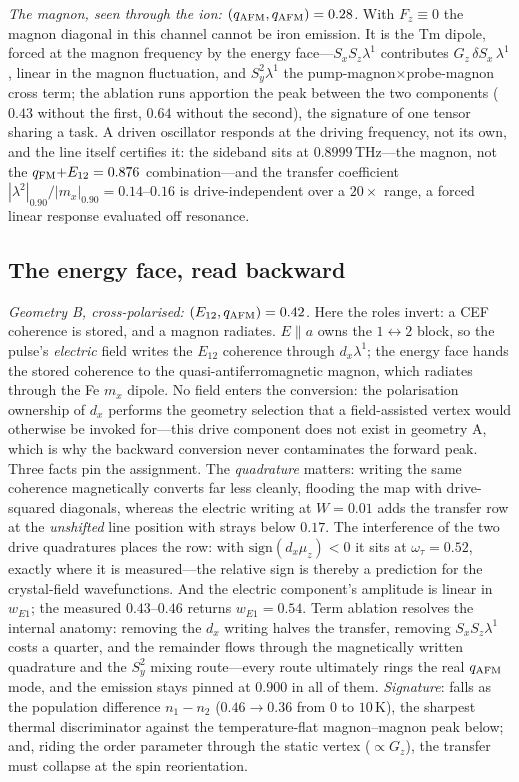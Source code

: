 \documentclass[aps,prb,twocolumn,superscriptaddress,longbibliography]{revtex4-2}
\newcommand{\qafm}{q_{\rm AFM}}
\newcommand{\qfm}{q_{\rm FM}}
\begin{document}
\emph{The magnon, seen through the ion: $(\qafm,\qafm)=0.28$.}  With
$F_z\equiv0$ the magnon diagonal in this channel cannot be iron
emission.  It is the Tm dipole, forced at the magnon frequency by the
energy face---$S_xS_z\lambda^1$ contributes $G_z\,\delta
S_x\,\lambda^1$, linear in the magnon fluctuation, and
$S_y^2\lambda^1$ the pump-magnon$\times$probe-magnon cross term; the
ablation runs apportion the peak between the two components ($0.43$
without the first, $0.64$ without the second), the signature of one
tensor sharing a task.  A driven oscillator responds at the driving
frequency, not its own, and the line itself certifies it: the
sideband sits at $0.8999$\,THz---the magnon, not the
$\qfm{+}E_{12}=0.876$ combination---and the transfer coefficient
$|\lambda^2|_{0.90}/|m_x|_{0.90}=0.14$--$0.16$ is drive-independent
over a $20\times$ range, a forced linear response evaluated off
resonance.

\subsection{The energy face, read backward}

\emph{Geometry B, cross-polarised: $(E_{12},\qafm)=0.42$.}  Here the
roles invert: a CEF coherence is stored, and a magnon radiates.
$E\!\parallel\!a$ owns the $1\!\leftrightarrow\!2$ block, so the
pulse's \emph{electric} field writes the $E_{12}$ coherence through
$d_x\lambda^1$; the energy face hands the stored coherence to the
quasi-antiferromagnetic magnon, which radiates through the Fe $m_x$
dipole.  No field enters the conversion: the polarisation ownership
of $d_x$ performs the geometry selection that a field-assisted vertex
would otherwise be invoked for---this drive component does not exist
in geometry A, which is why the backward conversion never
contaminates the forward peak.  Three facts pin the assignment.  The
\emph{quadrature} matters: writing the same coherence magnetically
converts far less cleanly, flooding the map with drive-squared
diagonals, whereas the electric writing at $W=0.01$ adds the transfer
row at the \emph{unshifted} line position with strays below $0.17$.
The interference of the two drive quadratures places the row: with
$\mathrm{sign}(d_x\mu_z)<0$ it sits at $\omega_\tau=0.52$, exactly
where it is measured---the relative sign is thereby a prediction for
the crystal-field wavefunctions.  And the electric component's
amplitude is linear in $w_{E1}$; the measured $0.43$--$0.46$ returns
$w_{E1}=0.54$.  Term ablation resolves the internal anatomy: removing
the $d_x$ writing halves the transfer, removing $S_xS_z\lambda^1$
costs a quarter, and the remainder flows through the magnetically
written quadrature and the $S_y^2$ mixing route---every route
ultimately rings the real $\qafm$ mode, and the emission stays pinned
at $0.900$ in all of them.  \emph{Signature}: falls as the population
difference $n_1-n_2$ ($0.46\to0.36$ from $0$ to $10$\,K), the
sharpest thermal discriminator against the temperature-flat
magnon--magnon peak below; and, riding the order parameter through
the static vertex ($\propto G_z$), the transfer must collapse at the
spin reorientation.
\end{document}
